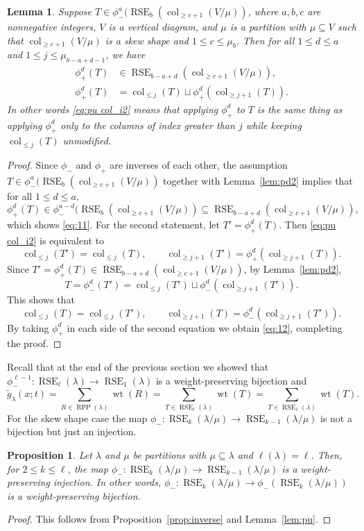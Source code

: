 \documentclass{amsart}
\numberwithin{equation}{section}
\newtheorem{lem}[thm]{Lemma}
\newtheorem{prop}[thm]{Proposition}
\theoremstyle{definition}
\newcommand\col{\operatorname{col}}
\newcommand\pd{\phi_+}
\newcommand\pu{\phi_-}
\newcommand\RSE{\operatorname{RSE}}
\newcommand\RPP{\operatorname{RPP}}
\newcommand\lm{{\lambda/\mu}}
\renewcommand\gg{\widetilde{g}}
\newcommand\wt{\operatorname{wt}}
\begin{document}
\begin{lem}\label{lem:pu2}
  Suppose $T\in\pu^a(\RSE_{b}(\col_{\ge c+1}(V/\mu))$, where $a,b,c$ are
  nonnegative integers, $V$ is a vertical diagram, and $\mu$ is a partition with
  $\mu\subseteq V$ such that $\col_{\ge c+1}(V/\mu)$ is a skew shape and $1\le
  c\le\mu_b$. Then for all $1\le d\le a$ and $1\le j\le \mu_{b-a+d-1}$, we have
  \begin{align}
    \label{eq:11}
  \pd^d(T)&\in\RSE_{b-a+d}(\col_{\ge c+1}(V/\mu)),\\
    \label{eq:pu col_i2}
    \pd^d(T) &= \col_{\le j}(T) \sqcup \pd^d(\col_{\ge j+1}(T)).    
  \end{align}
  In other words \eqref{eq:pu col_i2} means that applying $\pd^d$ to $T$ is the same
  thing as applying $\pd^d$ only to the columns of index greater than $j$
  while keeping $\col_{\le j}(T)$ unmodified.
\end{lem}
\begin{proof}
  Since $\pu$ and $\pd$ are inverses of each other, the assumption
  $T\in\pu^a(\RSE_{b}(\col_{\ge c+1}(V/\mu))$ together with Lemma~\ref{lem:pd2}
  implies that for all $1\le d\le a$,
  \[
    \pd^d(T)\in \pu^{a-d}(\RSE_{b}(\col_{\ge c+1}(V/\mu))
    \subseteq\RSE_{b-a+d}(\col_{\ge c+1}(V/\mu)),
  \]
  which shows \eqref{eq:11}. For the second statement, let $T'=\pd^d(T)$. Then
  \eqref{eq:pu col_i2} is equivalent to
  \begin{equation}
    \label{eq:12}
    \col_{\le j}(T') = \col_{\le j}(T),\qquad
    \col_{\ge j+1}(T') = \pd^d(\col_{\ge j+1}(T)).
  \end{equation}
Since $T'=\pd^d(T)\in\RSE_{b-a+d}(\col_{\ge c+1}(V/\mu))$, by Lemma~\ref{lem:pd2},
\[
T=\pu^d(T') = \col_{\le j}(T')\sqcup \pu^d(\col_{\ge j+1}(T')). 
\]
This shows that
\[
    \col_{\le j}(T) = \col_{\le j}(T'),\qquad
    \col_{\ge j+1}(T) = \pu^d(\col_{\ge j+1}(T')).
\]
By taking $\pd^d$ in each side of the second equation we obtain \eqref{eq:12},
completing the proof.
\end{proof}

Recall that at the end of the previous section we showed that
$\pu^{\ell-1}:\RSE_\ell(\lambda)\to\RSE_1(\lambda)$ is a weight-preserving
bijection and 
\[
  \gg_\lambda(x;t) = \sum_{R\in\RPP(\lambda)} \wt(R)=
  \sum_{T\in\RSE_\ell(\lambda)} \wt(T)= \sum_{T\in\RSE_1(\lambda)} \wt(T).
\]
For the skew shape case the map $\pu:\RSE_k(\lm)\to \RSE_{k-1}(\lm)$ is not a
bijection but just an injection.

\begin{prop}\label{prop:wpinj}
  Let $\lambda$ and $\mu$ be partitions with $\mu\subseteq\lambda$ and
  $\ell(\lambda)=\ell$. Then, for $2\le k\le \ell$, the map $\pu:\RSE_k(\lm)\to
  \RSE_{k-1}(\lm)$ is a weight-preserving injection. In other words,
  $\pu:\RSE_k(\lm)\to \pu(\RSE_k(\lm))$ is a weight-preserving bijection.
\end{prop}
\begin{proof}
  This follows from Proposition~\ref{prop:inverse} and Lemma~\ref{lem:pu}.
\end{proof}
\end{document}
